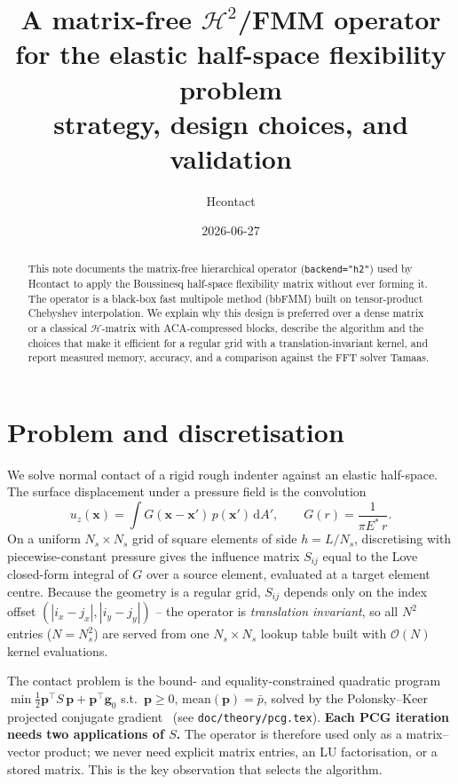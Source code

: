 \documentclass[11pt,a4paper]{article}
\title{A matrix-free $\mathcal{H}^2$/FMM operator for the elastic
half-space flexibility problem\\[2pt]
\large strategy, design choices, and validation}
\author{Hcontact}
\date{2026-06-27}
\newcommand{\Es}{E^{*}}
\newcommand{\Order}{\mathcal{O}}
\begin{document}
\maketitle

\begin{abstract}
This note documents the matrix-free hierarchical operator
(\texttt{backend="h2"}) used by Hcontact to apply the Boussinesq half-space
flexibility matrix without ever forming it. The operator is a black-box
fast multipole method (bbFMM) built on tensor-product Chebyshev
interpolation. We explain why this design is preferred over a dense matrix
or a classical $\mathcal{H}$-matrix with ACA-compressed blocks, describe the
algorithm and the choices that make it efficient for a regular grid with a
translation-invariant kernel, and report measured memory, accuracy, and a
comparison against the FFT solver Tamaas.
\end{abstract}

\section{Problem and discretisation}

We solve normal contact of a rigid rough indenter against an elastic
half-space. The surface displacement under a pressure field is the
convolution
\begin{equation}
  u_z(\mathbf{x}) = \int G(\mathbf{x}-\mathbf{x}')\,p(\mathbf{x}')\,\mathrm{d}A',
  \qquad
  G(r) = \frac{1}{\pi \Es\, r}.
\end{equation}
On a uniform $N_s\times N_s$ grid of square elements of side $h=L/N_s$,
discretising with piecewise-constant pressure gives the influence
matrix $S_{ij}$ equal to the Love~\cite{Love1929} closed-form integral of $G$
over a source element, evaluated at a target element centre. Because the geometry
is a regular grid, $S_{ij}$ depends only on the index offset
$(|i_x-j_x|,|i_y-j_y|)$ -- the operator is \emph{translation invariant}, so
all $N^2$ entries ($N=N_s^2$) are served from one $N_s\times N_s$ lookup
table built with $\Order(N)$ kernel evaluations.

The contact problem is the bound- and equality-constrained quadratic
program $\min \tfrac12 \mathbf{p}^\top S\,\mathbf{p} + \mathbf{p}^\top
\mathbf{g}_0$ s.t.\ $\mathbf{p}\ge 0$, $\mathrm{mean}(\mathbf{p})=\bar p$,
solved by the Polonsky--Keer projected conjugate gradient~\cite{PolKeer1999}
(see \texttt{doc/theory/pcg.tex}). \textbf{Each PCG iteration needs two
applications of $S$.} The operator is therefore used only as a
matrix--vector product; we never need explicit matrix entries, an LU
factorisation, or a stored matrix. This is the key observation that selects
the algorithm.
\end{document}
